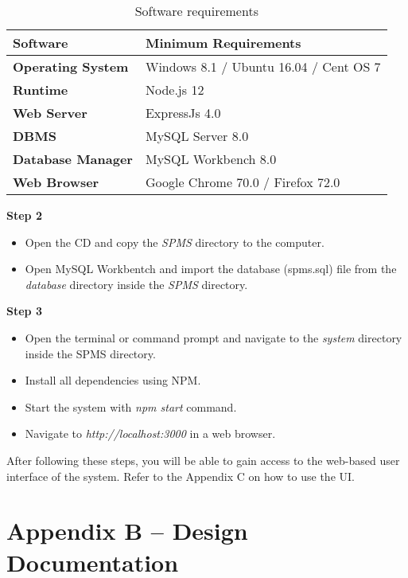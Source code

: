 \documentclass[12pt]{report}
\begin{document}
\begin{table}[H]
	\centering
	\begin{tabular}{ | p{2.5cm} | p{8.5cm} |}
		\hline
		\bf{Software}         & \bf{Minimum Requirements}              \\
		\hline
		\bf{Operating System} & Windows 8.1 / Ubuntu 16.04 / Cent OS 7 \\
		\hline
		\bf{Runtime}          & Node.js 12                             \\
		\hline
		\bf{Web Server}       & ExpressJs  4.0                         \\
		\hline
		\bf{DBMS}             & MySQL Server 8.0                       \\
		\hline
		\bf{Database Manager} & MySQL Workbench 8.0                    \\
		\hline
		\bf{Web Browser}      & Google Chrome 70.0 / Firefox   72.0    \\
		\hline
	\end{tabular}
	\caption{Software requirements}
\end{table}

\noindent
\large{\bf{Step 2}}
\begin{itemize}
	\item Open the CD and copy the {\it{SPMS}} directory to the computer.
	\item Open MySQL Workbentch and import the database (spms.sql) file from the {\it{database}} directory inside the {\it{SPMS}} directory.
\end{itemize}

\noindent
\large{\bf{Step 3}}
\begin{itemize}
	\item Open the terminal or command prompt and navigate to the {\it{system}} directory inside the SPMS directory.
	\item Install all dependencies using NPM.
	\item Start the system with {\it{npm start}} command.
	\item Navigate to {\it{http://localhost:3000}} in a web browser.
\end{itemize}

After following these steps, you will be able to gain access to the web-based user interface of the system. Refer to the Appendix C on how to use the UI.

\setcounter{chapter}{2}
\chapter*{\Huge Appendix B – Design Documentation}
\end{document}
